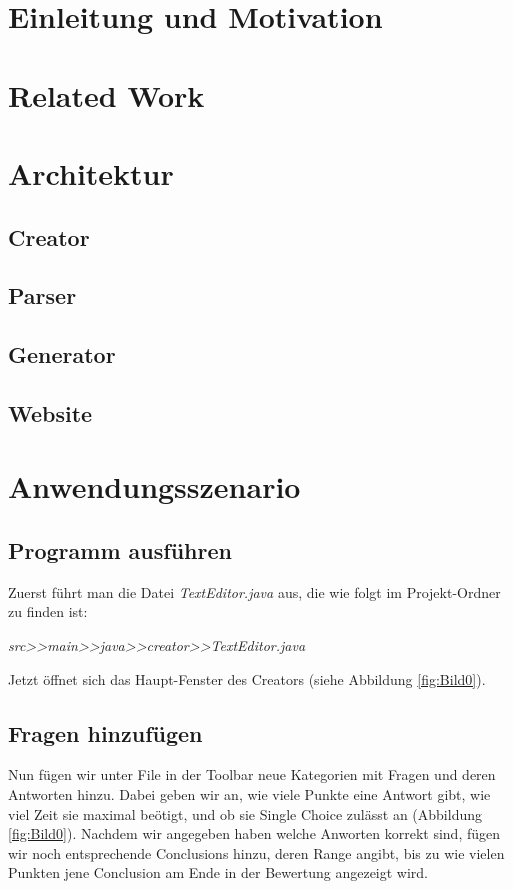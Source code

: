 \documentclass[a4paper,12pt,headsepline,twocolumn]{scrartcl}
\begin{document}
\section{Einleitung und Motivation}


\section{Related Work}



\section{Architektur}



\subsection{Creator}



\subsection{Parser}



\subsection{Generator}



\subsection{Website}



\section{Anwendungsszenario}
\subsection{Programm ausführen}
Zuerst führt man die Datei \textit{TextEditor.java} aus, die wie folgt im Projekt-Ordner zu finden ist:\newline 

\textit{src>>main>>java>>creator>>TextEditor.java}\newline 

Jetzt öffnet sich das Haupt-Fenster des Creators (siehe Abbildung \ref{fig:Bild0}).
\subsection{Fragen hinzufügen}
Nun fügen wir unter File in der Toolbar neue Kategorien mit Fragen und deren Antworten hinzu. Dabei geben wir an, wie viele Punkte eine Antwort gibt, wie viel Zeit sie maximal beötigt, und ob sie Single Choice zulässt an (Abbildung \ref{fig:Bild0}). Nachdem wir angegeben haben welche Anworten korrekt sind, fügen wir noch entsprechende Conclusions hinzu, deren Range angibt, bis zu wie vielen Punkten jene Conclusion am Ende in der Bewertung angezeigt wird. 
\end{document}
